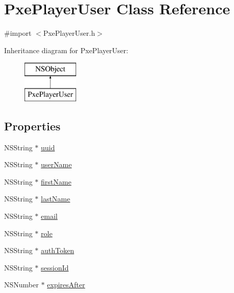 \hypertarget{interface_pxe_player_user}{\section{Pxe\-Player\-User Class Reference}
\label{interface_pxe_player_user}
}


{\ttfamily \#import $<$Pxe\-Player\-User.\-h$>$}

Inheritance diagram for Pxe\-Player\-User\-:\begin{figure}[H]
\begin{center}
\leavevmode
\includegraphics[height=2.000000cm]{interface_pxe_player_user}
\end{center}
\end{figure}
\subsection*{Properties}
\begin{DoxyCompactItemize}
\item 
N\-S\-String $\ast$ \hyperlink{interface_pxe_player_user_a485261fd8e11e460f318ba14ef6484e0}{uuid}
\item 
N\-S\-String $\ast$ \hyperlink{interface_pxe_player_user_ac61d65d5588236d1d011d2ea1d8aa71c}{user\-Name}
\item 
N\-S\-String $\ast$ \hyperlink{interface_pxe_player_user_af3074e4f38e3083152cb1a2109bffa82}{first\-Name}
\item 
N\-S\-String $\ast$ \hyperlink{interface_pxe_player_user_ae3090771746d08c97a05cff607924477}{last\-Name}
\item 
N\-S\-String $\ast$ \hyperlink{interface_pxe_player_user_a1a39f13f885fbf6dfea1ccc0856ca13a}{email}
\item 
N\-S\-String $\ast$ \hyperlink{interface_pxe_player_user_aa0dfff35b9add60a790f31b11e952bd0}{role}
\item 
N\-S\-String $\ast$ \hyperlink{interface_pxe_player_user_a3e471652db745d470f639bd926e49ee7}{auth\-Token}
\item 
N\-S\-String $\ast$ \hyperlink{interface_pxe_player_user_a618d6c7e2c35d106c6accf4702c87d9a}{session\-Id}
\item 
N\-S\-Number $\ast$ \hyperlink{interface_pxe_player_user_af6e60b5781ab406dbbff7ccb8a91803d}{expires\-After}
\end{DoxyCompactItemize}


